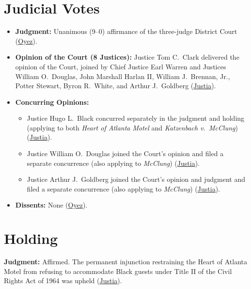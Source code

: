 \documentclass[12pt]{article}
\begin{document}
\section{Judicial Votes}
\begin{itemize}
\item \textbf{Judgment:} Unanimous (9--0) affirmance of the three-judge District Court (\href{https://www.oyez.org/cases/1964/515}{Oyez}).
\item \textbf{Opinion of the Court (8 Justices):} Justice Tom C.\ Clark delivered the opinion of the Court, joined by Chief Justice Earl Warren and Justices William O.\ Douglas, John Marshall Harlan II, William J.\ Brennan, Jr., Potter Stewart, Byron R.\ White, and Arthur J.\ Goldberg (\href{https://supreme.justia.com/cases/federal/us/379/241/}{Justia}).
\item \textbf{Concurring Opinions:}
  \begin{itemize}
  \item Justice Hugo L.\ Black concurred separately in the judgment and holding (applying to both \textit{Heart of Atlanta Motel} and \textit{Katzenbach v.\ McClung}) (\href{https://supreme.justia.com/cases/federal/us/379/241/}{Justia}).
  \item Justice William O.\ Douglas joined the Court's opinion and filed a separate concurrence (also applying to \textit{McClung}) (\href{https://supreme.justia.com/cases/federal/us/379/241/}{Justia}).
  \item Justice Arthur J.\ Goldberg joined the Court's opinion and judgment and filed a separate concurrence (also applying to \textit{McClung}) (\href{https://supreme.justia.com/cases/federal/us/379/241/}{Justia}).
  \end{itemize}
\item \textbf{Dissents:} None (\href{https://www.oyez.org/cases/1964/515}{Oyez}).
\end{itemize}

\section{Holding}
\textbf{Judgment:} Affirmed. The permanent injunction restraining the Heart of Atlanta Motel from refusing to accommodate Black guests under Title II of the Civil Rights Act of 1964 was upheld (\href{https://supreme.justia.com/cases/federal/us/379/241/}{Justia}).
\end{document}
